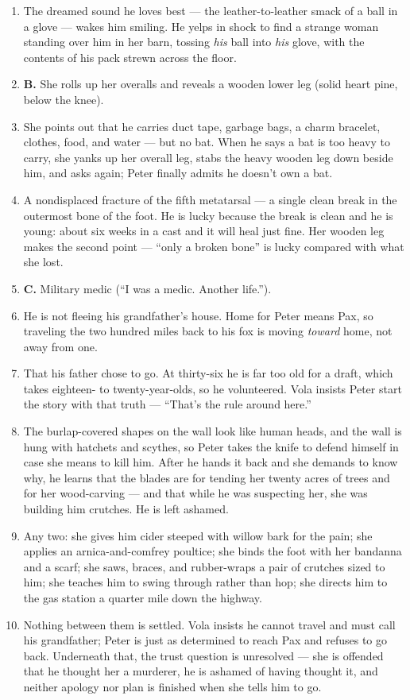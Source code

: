 \documentclass[11pt]{article}
\begin{document}
\begin{enumerate}[start=11]
  \item The dreamed sound he loves best --- the leather-to-leather smack of a ball in a glove --- wakes him smiling. He yelps in shock to find a strange woman standing over him in her barn, tossing \emph{his} ball into \emph{his} glove, with the contents of his pack strewn across the floor.
  \item \textbf{B.} She rolls up her overalls and reveals a wooden lower leg (solid heart pine, below the knee).
  \item She points out that he carries duct tape, garbage bags, a charm bracelet, clothes, food, and water --- but no bat. When he says a bat is too heavy to carry, she yanks up her overall leg, stabs the heavy wooden leg down beside him, and asks again; Peter finally admits he doesn't own a bat.
  \item A nondisplaced fracture of the fifth metatarsal --- a single clean break in the outermost bone of the foot. He is lucky because the break is clean and he is young: about six weeks in a cast and it will heal just fine. Her wooden leg makes the second point --- ``only a broken bone'' is lucky compared with what she lost.
  \item \textbf{C.} Military medic (``I was a medic. Another life.'').
  \item He is not fleeing his grandfather's house. Home for Peter means Pax, so traveling the two hundred miles back to his fox is moving \emph{toward} home, not away from one.
  \item That his father chose to go. At thirty-six he is far too old for a draft, which takes eighteen- to twenty-year-olds, so he volunteered. Vola insists Peter start the story with that truth --- ``That's the rule around here.''
  \item The burlap-covered shapes on the wall look like human heads, and the wall is hung with hatchets and scythes, so Peter takes the knife to defend himself in case she means to kill him. After he hands it back and she demands to know why, he learns that the blades are for tending her twenty acres of trees and for her wood-carving --- and that while he was suspecting her, she was building him crutches. He is left ashamed.
  \item Any two: she gives him cider steeped with willow bark for the pain; she applies an arnica-and-comfrey poultice; she binds the foot with her bandanna and a scarf; she saws, braces, and rubber-wraps a pair of crutches sized to him; she teaches him to swing through rather than hop; she directs him to the gas station a quarter mile down the highway.
  \item Nothing between them is settled. Vola insists he cannot travel and must call his grandfather; Peter is just as determined to reach Pax and refuses to go back. Underneath that, the trust question is unresolved --- she is offended that he thought her a murderer, he is ashamed of having thought it, and neither apology nor plan is finished when she tells him to go.
\end{enumerate}
\end{document}
